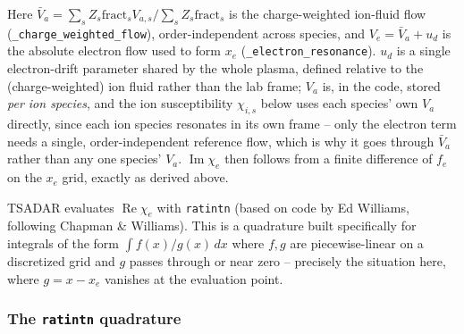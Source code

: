\documentclass[11pt]{article}
\newcommand{\code}[1]{\texttt{#1}}
\begin{document}
Here $\bar V_a=\sum_sZ_s\mathrm{fract}_sV_{a,s}\big/\sum_sZ_s\mathrm{fract}_s$ is the
charge-weighted ion-fluid flow (\code{\_charge\_weighted\_flow}), order-independent across
species, and $V_e=\bar V_a+u_d$ is the absolute electron flow used to form $x_e$
(\code{\_electron\_resonance}). $u_d$ is a single electron-drift parameter shared by the
whole plasma, defined relative to the (charge-weighted) ion fluid rather than the lab
frame; $V_a$ is, in the code, stored \emph{per ion species}, and the ion susceptibility
$\chi_{i,s}$ below uses each species' own $V_a$ directly, since each ion species resonates
in its own frame -- only the electron term needs a single, order-independent reference
flow, which is why it goes through $\bar V_a$ rather than any one species' $V_a$.
$\operatorname{Im}\chi_e$ then follows from a finite difference of $f_e$ on the $x_e$ grid,
exactly as derived above.

TSADAR evaluates $\operatorname{Re}\chi_e$ with \code{ratintn} (based on code by Ed
Williams, following Chapman \& Williams). This is a quadrature built specifically for
integrals of the form $\int f(x)/g(x)\,dx$ where $f,g$ are piecewise-linear on a
discretized grid and $g$ passes through or near zero -- precisely the situation here,
where $g=x-x_e$ vanishes at the evaluation point.

\subsubsection{The \code{ratintn} quadrature}\label{sec:ratintn}
\end{document}
